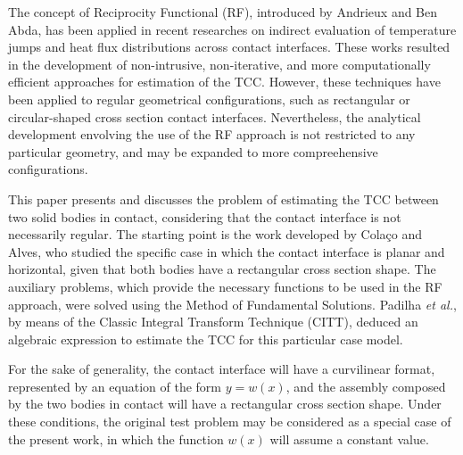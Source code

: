 \documentclass[conference,compsoc,fleqn]{IEEEtran}
\begin{document}
The concept of Reciprocity Functional (RF), introduced by Andrieux and Ben Abda\cite{artigo_andrieux}, has been applied in recent researches on indirect evaluation of temperature jumps and heat flux distributions across contact interfaces\cite{reciproc_3, artigo_colaco_2, artigo_colaco_3, artigo_abreu_2,artigo_abreu_3, artigo_padilha_2}. These works resulted in the development of non-intrusive, non-iterative, and more computationally efficient approaches for estimation of the TCC. However, these techniques have been applied to regular geometrical configurations, such as rectangular or circular-shaped cross section contact interfaces. Nevertheless, the analytical development envolving the use of the RF approach is not restricted to any particular geometry, and may be expanded to more compreehensive configurations.

This paper presents and discusses the problem of estimating the TCC between two solid bodies in contact, considering that the contact interface is not necessarily regular. The starting point is the work developed by Colaço and Alves\cite{reciproc_3}, who studied the specific case in which the contact interface is planar and horizontal, given that both bodies have a rectangular cross section shape. The auxiliary problems, which provide the necessary functions to be used in the RF approach, were solved using the Method of Fundamental Solutions. Padilha \textit{et al.}\cite{artigo_padilha_3}, by means of the Classic Integral Transform Technique (CITT)\cite{livro_integral_transforms_cotta}, deduced an algebraic expression to estimate the TCC for this particular case model.

For the sake of generality, the contact interface will have a curvilinear format, represented by an equation of the form $y = w(x)$, and the assembly composed by the two bodies in contact will have a rectangular cross section shape. Under these conditions, the original test problem\cite{reciproc_3} may be considered as a special case of the present work, in which the function $w(x)$ will assume a constant value. 
\\

\end{document}
